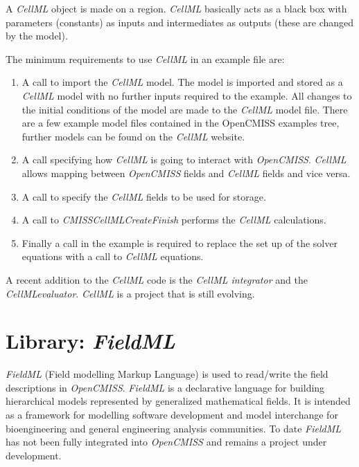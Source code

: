A \emph{CellML} object is made on a region. \emph{CellML} basically acts as a
black box with parameters (constants) as inputs and intermediates as outputs 
(these are changed by the model). 

The minimum requirements to use \emph{CellML} in an example file are: 

\begin{enumerate}
 \item A call to import the \emph{CellML} model. The model is imported and
stored as a \emph{CellML} model with no further inputs required to the 
example. All changes to the initial conditions of the model are made to 
the \emph{CellML} model file. There are a few example model files contained 
in the OpenCMISS examples tree, further models can be found on the 
\emph{CellML} website.
 \item A call specifying how \emph{CellML} is going to interact with
\emph{OpenCMISS}. \emph{CellML} allows mapping between \emph{OpenCMISS} 
fields and \emph{CellML} fields and vice versa. 
 \item A call to specify the \emph{CellML} fields to be used for storage. 
 \item A call to \emph{CMISSCellMLCreateFinish} performs the \emph{CellML}
calculations.
 \item Finally a call in the example is required to replace the set up of the
solver equations with a call to \emph{CellML} equations.
\end{enumerate}

\noindent A recent addition to the \emph{CellML} code is the \emph{CellML
integrator} and the \emph{CellMLevaluator}. \emph{CellML} is a project 
that is still evolving.



\section{Library: \emph{FieldML}}
\label{sec:fieldml}

\emph{FieldML} (Field modelling Markup Language) is used to read/write the
field descriptions in \emph{OpenCMISS}. \emph{FieldML} is a declarative 
language for building hierarchical models represented by generalized 
mathematical fields. It is intended as a framework for modelling software 
development and model interchange for bioengineering and general 
engineering analysis communities. To date \emph{FieldML} has not been 
fully integrated into \emph{OpenCMISS} and remains a project under 
development.



